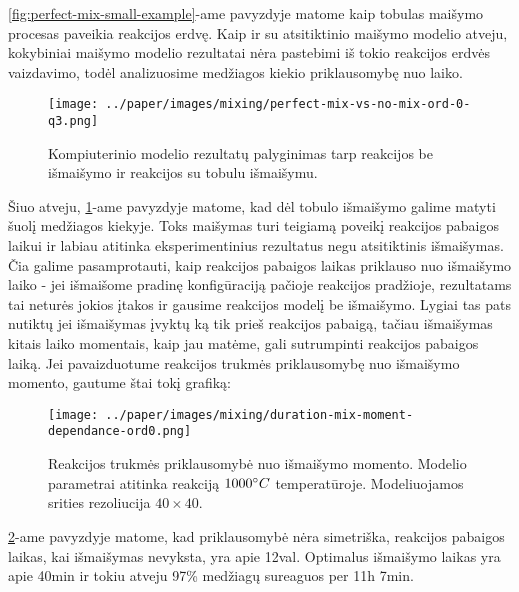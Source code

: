 \ref{fig:perfect-mix-small-example}-ame pavyzdyje matome kaip tobulas maišymo procesas paveikia reakcijos erdvę. Kaip ir su atsitiktinio maišymo modelio atveju, kokybiniai maišymo modelio rezultatai nėra pastebimi iš tokio reakcijos erdvės vaizdavimo, todėl analizuosime medžiagos kiekio priklausomybę nuo laiko.

\newpage

\begin{figure}[h!]
    \centering
    \texttt{[image: ../paper/images/mixing/perfect-mix-vs-no-mix-ord-0-q3.png]}

    \caption{Kompiuterinio modelio rezultatų palyginimas tarp reakcijos be išmaišymo ir reakcijos su tobulu išmaišymu.  }

    \label{optimal-mix-qnt}
\end{figure}

Šiuo atveju, \ref{optimal-mix-qnt}-ame pavyzdyje matome, kad dėl tobulo išmaišymo galime matyti šuolį medžiagos kiekyje. Toks maišymas turi teigiamą poveikį reakcijos pabaigos laikui ir labiau atitinka eksperimentinius rezultatus negu atsitiktinis išmaišymas.
Čia galime pasamprotauti, kaip reakcijos pabaigos laikas priklauso nuo išmaišymo laiko - jei išmaišome pradinę konfigūraciją pačioje reakcijos pradžioje, rezultatams tai neturės jokios įtakos ir gausime reakcijos modelį be išmaišymo. Lygiai tas pats nutiktų jei išmaišymas įvyktų ką tik prieš reakcijos pabaigą, tačiau išmaišymas kitais laiko momentais, kaip jau matėme, gali sutrumpinti reakcijos pabaigos laiką. Jei pavaizduotume reakcijos trukmės priklausomybę nuo išmaišymo momento, gautume štai tokį grafiką:

\begin{figure}[h!]
    \centering
    \texttt{[image: ../paper/images/mixing/duration-mix-moment-dependance-ord0.png]}

    \caption{Reakcijos trukmės priklausomybė nuo išmaišymo momento. Modelio parametrai atitinka reakciją $1000\degree C$ temperatūroje. Modeliuojamos srities rezoliucija $40\times40$. }

    \label{fig:duration-mix-moment-graph-for-small-space}
\end{figure}

\ref{fig:duration-mix-moment-graph-for-small-space}-ame pavyzdyje matome, kad priklausomybė nėra simetriška, reakcijos pabaigos laikas, kai išmaišymas nevyksta, yra apie 12val. Optimalus išmaišymo laikas yra apie 40min ir tokiu atveju 97\% medžiagų sureaguos per 11h 7min.

